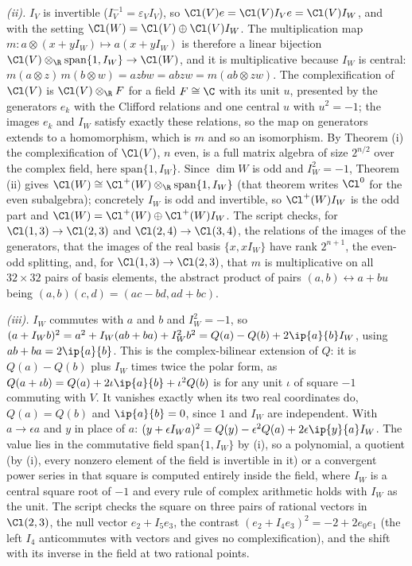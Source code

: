 \emph{(ii).} $I_{V}$ is invertible ($I_{V}^{-1} = \varepsilon_{V}I_{V}$), so $\Cl(V)e = \Cl(V)I_{V}e = \Cl(V)I_{W}$, and with the setting $\Cl(W) = \Cl(V) \oplus \Cl(V)I_{W}$. The multiplication map $m: a \otimes (x + yI_{W}) \mapsto a(x + yI_{W})$ is therefore a linear bijection $\Cl(V) \otimes_{\R} \mathrm{span}\{1, I_{W}\} \to \Cl(W)$, and it is multiplicative because $I_{W}$ is central: $m(a \otimes z)\,m(b \otimes w) = azbw = abzw = m(ab \otimes zw)$. The complexification of $\Cl(V)$ is $\Cl(V) \otimes_{\R} F$ for a field $F \cong \C$ with its unit $u$, presented by the generators $e_{k}$ with the Clifford relations and one central $u$ with $u^{2} = -1$; the images $e_{k}$ and $I_{W}$ satisfy exactly these relations, so the map on generators extends to a homomorphism, which is $m$ and so an isomorphism. By Theorem (i) the complexification of $\Cl(V)$, $n$ even, is a full matrix algebra of size $2^{n/2}$ over the complex field, here $\mathrm{span}\{1, I_{W}\}$. Since $\dim W$ is odd and $I_{W}^{2} = -1$, Theorem (ii) gives $\Cl(W) \cong \Cl^{+}(W) \otimes_{\R} \mathrm{span}\{1, I_{W}\}$ (that theorem writes $\Cl^{0}$ for the even subalgebra); concretely $I_{W}$ is odd and invertible, so $\Cl^{+}(W)I_{W}$ is the odd part and $\Cl(W) = \Cl^{+}(W) \oplus \Cl^{+}(W)I_{W}$. The script checks, for $\Cl(1,3) \to \Cl(2,3)$ and $\Cl(2,4) \to \Cl(3,4)$, the relations of the images of the generators, that the images of the real basis $\{x, xI_{W}\}$ have rank $2^{n+1}$, the even-odd splitting, and, for $\Cl(1,3) \to \Cl(2,3)$, that $m$ is multiplicative on all $32 \times 32$ pairs of basis elements, the abstract product of pairs $(a, b) \leftrightarrow a + bu$ being $(a, b)(c, d) = (ac - bd, ad + bc)$.

\emph{(iii).} $I_{W}$ commutes with $a$ and $b$ and $I_{W}^{2} = -1$, so $(a + I_{W}b)^{2} = a^{2} + I_{W}(ab + ba) + I_{W}^{2}b^{2} = Q(a) - Q(b) + 2\ip{a}{b}I_{W}$, using $ab + ba = 2\ip{a}{b}$. This is the complex-bilinear extension of $Q$: it is $Q(a) - Q(b)$ plus $I_{W}$ times twice the polar form, as $Q(a + \iota b) = Q(a) + 2\iota\ip{a}{b} + \iota^{2}Q(b)$ is for any unit $\iota$ of square $-1$ commuting with $V$. It vanishes exactly when its two real coordinates do, $Q(a) = Q(b)$ and $\ip{a}{b} = 0$, since $1$ and $I_{W}$ are independent. With $a \to \epsilon a$ and $y$ in place of $a$: $(y + \epsilon I_{W}a)^{2} = Q(y) - \epsilon^{2}Q(a) + 2\epsilon\ip{y}{a}I_{W}$. The value lies in the commutative field $\mathrm{span}\{1, I_{W}\}$ by (i), so a polynomial, a quotient (by (i), every nonzero element of the field is invertible in it) or a convergent power series in that square is computed entirely inside the field, where $I_{W}$ is a central square root of $-1$ and every rule of complex arithmetic holds with $I_{W}$ as the unit. The script checks the square on three pairs of rational vectors in $\Cl(2,3)$, the null vector $e_{2} + I_{5}e_{3}$, the contrast $(e_{2} + I_{4}e_{3})^{2} = -2 + 2e_{0}e_{1}$ (the left $I_{4}$ anticommutes with vectors and gives no complexification), and the shift with its inverse in the field at two rational points.

